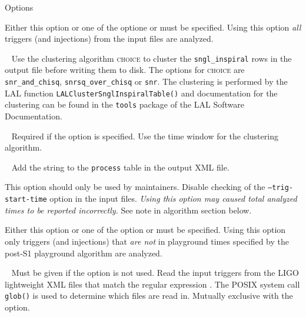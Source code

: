 \begin{entry}
\item[Options]\leavevmode
\begin{entry}
\item[ \option{--all-data}]
Either this option or one of the optione  or  must be specified.
Using this option \emph{all} triggers (and injections) from the input files are analyzed.

\item[\option{--cluster-algorithm}~\parm{choice}]
 Use the clustering algorithm \textsc{choice} to cluster the \verb$sngl_inspiral$ rows
in the output file before writing them to disk. The options for
\textsc{choice} are \verb$snr_and_chisq$, \verb$snrsq_over_chisq$ or
\verb$snr$. The clustering is performed by the LAL function
\verb$LALClusterSnglInspiralTable()$ and documentation for the clustering can
be found in the \texttt{tools} package of the LAL Software Documentation.

\item[ \option{--cluster-time}~\parm{t}]
Required if the  option is specified. Use the time window
 for the clustering algorithm.

\item[ \option{--comment}~\parm{string}]
Add the string  to the \verb$process$ table in the output XML file.

\item[\option{--disable-trig-start-time} ]
This option should only be used by
maintainers. Disable checking of the \texttt{--trig-start-time} option in the
input files. \emph{Using this option may caused total analyzed times to be
reported incorrectly.} See note in algorithm section below.

\item[ \option{--exclude-playground}]
Either this option or one of the option  or  must be specified.
Using this option only triggers (and injections) that \emph{are not} in playground times specified by the post-S1 playground algorithm are analyzed.

\item[\option{--glob}~\parm{globfiles} ]
Must be given if the  option is not used. Read the input triggers from the
LIGO lightweight XML files that match the regular expression
. The POSIX system call \verb$glob()$ is used to determine
which files are read in. Mutually exclusive with the  option.


\end{entry}
\end{entry}
